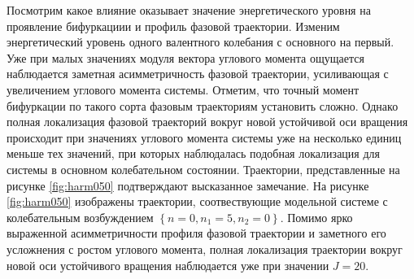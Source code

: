 Посмотрим какое влияние оказывает значение энергетического уровня на проявление бифуркациии и профиль фазовой траектории. Изменим энергетический уровень одного валентного колебания с основного на первый. Уже при малых значениях модуля вектора углового момента ощущается наблюдается заметная асимметричность фазовой траектории, усиливающая с увеличением углового момента системы. Отметим, что точный момент бифуркации по такого сорта фазовым траекториям установить сложно. Однако полная локализация фазовой траекторий вокруг новой устойчивой оси вращения происходит при значениях углового момента системы уже на несколько единиц меньше тех значений, при которых наблюдалась подобная локализация для системы в основном колебательном состоянии. Траектории, представленные на рисунке \eqref{fig:harm050} подтверждают высказанное замечание. На рисунке  \eqref{fig:harm050} изображены траектории, соотвествующие модельной системе с колебательным возбуждением $\left\{ n = 0, n_1 = 5, n_2 = 0 \right\}$. Помимо ярко выраженной асимметричности профиля фазовой траектории и заметного его усложнения с ростом углового момента, полная локализация траектории вокруг новой оси устойчивого вращения наблюдается уже при значении $J = 20$.

